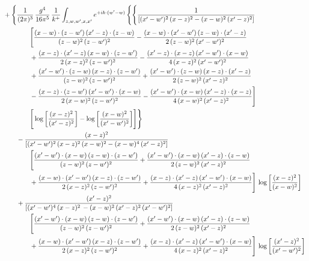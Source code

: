 \documentclass[10pt]{article}
\begin{document}
\begin{align}
&+\Bigg\{\frac{1}{(2\pi)^{3}}\,\frac{g^{4}}{16\pi^{5}}\,\frac{1}{k^{+}}\int_{z,w,w^{\prime},x,x^{\prime}}e^{+ik\cdot(w^{\prime}-w)}\,\Bigg\{\Bigg\{ \frac{1}{\left[(x^{\prime}-w^{\prime})^{2}\, (x-z)^{2}-(x-w)^{2}\, (x^{\prime}-z)^{2}\right]}\,\notag\\&\qquad\qquad  \Bigg[\frac{(x-w)\cdot (z-w^{\prime})\, (x^{\prime}-z)\cdot (z-w)}{(z-w)^{2}\,(z-w^{\prime})^{2}}-\frac{(x-w)\cdot (x^{\prime}-w^{\prime})\, (z-w)\cdot (x^{\prime}-z)}{2\, (z-w)^{2}\, (x^{\prime}-w^{\prime})^{2}}\notag\\&\qquad\qquad  + \frac{(x-z)\cdot (x^{\prime}-z)\, (x-w)\cdot (z-w^{\prime})}{2\, (x-z)^{2}\, (z-w^{\prime})^{2}}-\frac{(x^{\prime}-z)\cdot (x-z)\, (x^{\prime}-w^{\prime})\cdot (x-w)}{4\, (x-z)^{2}\, (x^{\prime}-w^{\prime})^{2}}\notag\\&\qquad\qquad  + \frac{(x^{\prime}-w^{\prime})\cdot (z-w)\, (x-z)\cdot (z-w^{\prime})}{(z-w)^{2}\,(z-w^{\prime})^{2}}+\frac{(x^{\prime}-w^{\prime})\cdot (z-w)\, (x-z)\cdot (x^{\prime}-z)}{2\, (z-w)^{2}\, (x^{\prime}-z)^{2}}\notag\\&\qquad\qquad  - \frac{(x-z)\cdot (z-w^{\prime})\, (x^{\prime}-w^{\prime})\cdot (x-w)}{2\, (x-w)^{2}\, (z-w^{\prime})^{2}} -\frac{(x^{\prime}-w^{\prime})\cdot (x-w)\, (x^{\prime}-z)\cdot (x-z)}{4\, (x-w)^{2}\, (x^{\prime}-z)^{2}}\Bigg]\notag\\&\qquad\qquad   \Bigg[\log{\left[\frac{(x-z)^{2}}{ (x^{\prime}-z)^{2}}\right]}-\log{\left[\frac{(x-w)^{2}}{(x^{\prime}-w^{\prime})^{2}}\right]}\Bigg]\Bigg\}\notag\\
&\qquad-\frac{(x-z)^{2}}{\left[(x^{\prime}-w^{\prime})^{2}\,(x-z)^{2}\,(x-w)^{2} - (x-w)^{4}\, (x^{\prime}-z)^{2}\right]}\,  \notag\\&\qquad\qquad  \Bigg[\frac{(x^{\prime}-w^{\prime})\cdot (x-w)\, (z-w)\cdot (z-w^{\prime})}{(z-w)^{2}\, (z-w^{\prime})^{2}}+\frac{(x^{\prime}-w^{\prime})\cdot (x-w)\, (x^{\prime}-z)\cdot (z-w)}{2\, (z-w)^{2}\, (x^{\prime}-z)^{2}}\notag\\&\qquad\qquad  +\frac{(x-w)\cdot (x^{\prime}-w^{\prime})\, (x-z)\cdot (z-w^{\prime})}{2\, (x-z)^{2}\, (z-w^{\prime})^{2}}+\frac{(x-z)\cdot (x^{\prime}-z)\, (x^{\prime}-w^{\prime})\cdot (x-w)}{4\, (x-z)^{2}\, (x^{\prime}-z)^{2}}\Bigg] \,\log{\left[\frac{(x-z)^{2}}{(x-w)^{2}}\right]}\notag\\
&\qquad+\frac{(x^{\prime}-z)^{2}}{\left[(x^{\prime}-w^{\prime})^{4}\,(x-z)^{2}\, - (x-w)^{2}\, (x^{\prime}-z)^{2}\,(x^{\prime}-w^{\prime})^{2}\right]}\,  \notag\\&\qquad\qquad  \Bigg[\frac{(x^{\prime}-w^{\prime})\cdot (x-w)\, (z-w)\cdot (z-w^{\prime})}{(z-w)^{2}\, (z-w^{\prime})^{2}}+\frac{(x^{\prime}-w^{\prime})\cdot (x-w)\, (x^{\prime}-z)\cdot (z-w)}{2\, (z-w)^{2}\, (x^{\prime}-z)^{2}}\notag\\&\qquad\qquad  +\frac{(x-w)\cdot (x^{\prime}-w^{\prime})\, (x-z)\cdot (z-w^{\prime})}{2\, (x-z)^{2}\, (z-w^{\prime})^{2}}+\frac{(x-z)\cdot (x^{\prime}-z)\, (x^{\prime}-w^{\prime})\cdot (x-w)}{4\, (x-z)^{2}\, (x^{\prime}-z)^{2}}\Bigg] \,\log{\left[\frac{(x^{\prime}-z)^{2}}{(x^{\prime}-w^{\prime})^{2}}\right]}\notag\\

\end{align}
\end{document}
